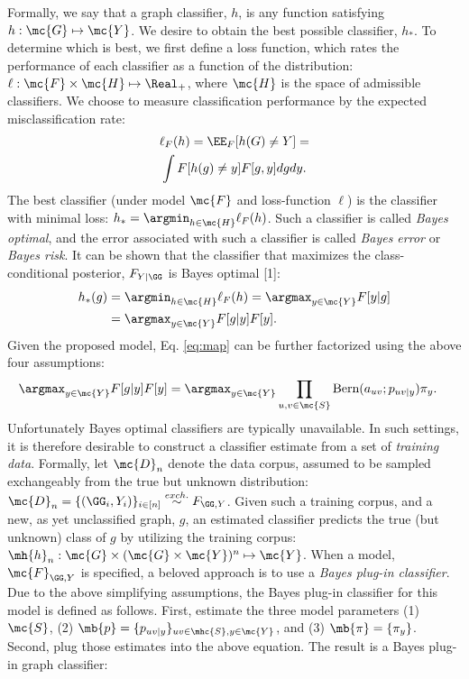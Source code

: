 \documentclass[10pt,journal,cspaper,compsoc]{IEEEtran}
\begin{document}
Formally, we say that a graph classifier, $h$, is any function satisfying $h: \mc{G} \mapsto \mc{Y}$.  We desire to obtain the best possible classifier, $h_*$. To determine which is best, we first define a loss function, which rates the performance of each classifier as a function of the distribution: $\ell: \mc{F} \times \mc{H} \mapsto \Real_+$, where $\mc{H}$ is the space of admissible classifiers.  We choose to measure classification performance by the expected misclassification rate:
\begin{multline}
\ell_F(h) = \EE_{F}[h(G) \neq Y] =\\ \int
F[h(g) \neq y] F[g,y] dgdy.
\end{multline}
The best classifier (under model $\mc{F}$ and loss-function $\ell$) is the classifier with minimal loss: $h_*=\argmin_{h \in \mc{H}} \ell_F(h)$.  Such a classifier is called \emph{Bayes optimal}, and the error associated with such a classifier is called \emph{Bayes error} or \emph{Bayes risk}.  It can be shown that the classifier that maximizes the class-conditional posterior, $F_{Y | \GG}$ is Bayes optimal [1]:
\begin{align} \label{eq:map}
h_*(g) &= \argmin_{h \in \mc{H}} \ell_F(h) = \argmax_{y \in \mc{Y}} F[y|g] 
\nonumber \\ &= \argmax_{y \in \mc{Y}} F[g|y] F[y].
\end{align}
Given the proposed model, Eq. \eqref{eq:map} can be further factorized using the above four assumptions:
\begin{align}
\argmax_{y \in \mc{Y}} F[g|y] F[y] 
&= \argmax_{y \in \mc{Y}} \prod_{u,v \in \mc{S}} \text{Bern}(a_{uv}; p_{uv|y}) \pi_y.
\end{align}
Unfortunately Bayes optimal classifiers are typically unavailable. In such settings, it is therefore desirable to construct a classifier estimate from a set of \emph{training data}. Formally, let $\mc{D}_n$ denote the data corpus, assumed to be sampled exchangeably from the true but unknown distribution: $\mc{D}_n=\{(\GG_i,Y_i)\}_{i \in [n]} \overset{exch.}{\sim} F_{\GG, Y}$.  Given such a training corpus, and a new, as yet unclassified graph, $g$, an estimated classifier predicts the true (but unknown) class of $g$ by utilizing the training corpus: $\mh{h}_n: \mc{G} \times (\mc{G} \times \mc{Y})^n \mapsto \mc{Y}$.  When a model, $\mc{F}_{\GG,Y}$ is specified, a beloved approach is to use  a  \emph{Bayes plug-in classifier}. Due to the above simplifying assumptions, the Bayes plug-in classifier for this model is defined as follows.  First, estimate the three model parameters (1) $\mc{S}$, (2) $\mb{p}=\{p_{uv|y}\}_{uv \in \mhc{S}, y \in \mc{Y}}$, and (3)  $\mb{\pi}=\{\pi_y\}$. Second, plug those estimates into the above equation.  The result is a Bayes plug-in graph classifier:
\end{document}
